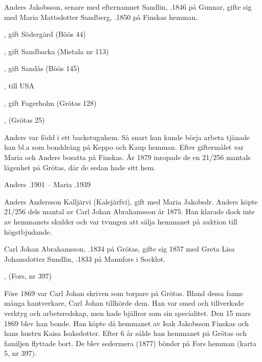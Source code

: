 Anders Jakobsson, senare med efternamnet Sandlin, .1846 på Gunnar, gifte sig med Maria Mattsdotter Sandberg, .1850 på Finskas hemman.
\begin{jhchildren}
  \item {}
  \item {}, gift Södergård (Böös 44)
  \item {}, gift Sandbacka (Mietala nr 113)
  \item {}, gift Sandås (Böös 145)
  \item {}, till USA
  \item {}
  \item {}
  \item {}, gift Fagerholm (Grötas 128)
  \item {}, (Grötas 25)
\end{jhchildren}
Anders var född i ett backstuguhem. Så snart han kunde börja arbeta tjänade han bl.a som bonddräng på Keppo och Kaup hemman. Efter giftermålet var Maria och Anders bosatta på Finskas. År 1879 inropade de en 21/256 mantals lägenhet på Grötas, där de sedan hade sitt hem.

Anders .1901  --  Maria .1939


Anders Andersson Kalljärvi (Kalejärfvi), gift med Maria Jakobsdr. Anders köpte 21/256 dels mantal av Carl Johan Abrahamsson år 1875. Han klarade dock inte av hemmanets skulder och var tvungen att sälja hemmanet på auktion till högstbjudande.


Carl Johan Abrahamsson, .1834 på Grötas, gifte sig 1857 med Greta Lisa Johansdotter Sundlin, .1833 på Mannfors i Socklot.
\begin{jhchildren}
  \item {}, (Fors, nr 397)
  \item {}
  \item {}
  \item {}
  \item {}
  \item {}
\end{jhchildren}
Före 1869 var Carl Johan skriven som torpare på Grötas. Bland dessa fanns många hantverkare, Carl Johan tillhörde dem. Han var smed och tillverkade verktyg och arbetsredskap, men hade bjällror som sin specialitet. Den 15 mars 1869 blev han bonde. Han köpte då  hemmanet av Isak Jakobsson Finskas och hans hustru Kaisa Isaksdotter. Efter 6 år sålde han hemmanet på Grötas och familjen flyttade bort. De blev sedermera (1877) bönder på Fors hemman (karta 5, nr 397).

